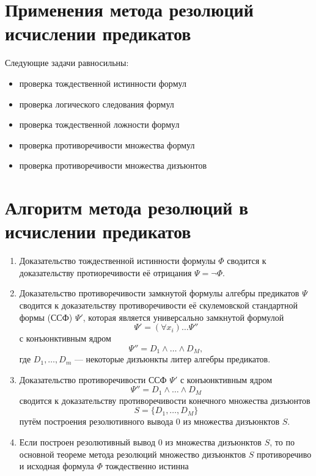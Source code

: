 \section{Применения метода резолюций исчислении предикатов}
Следующие задачи равносильны:
\begin{itemize}
    \item проверка тождественной истинности формул
    \item проверка логического следования формул
    \item проверка тождественной ложности формул
    \item проверка противоречивости множества формул
    \item проверка противоречивости множества дизъюнтов
\end{itemize}

\section{Алгоритм метода резолюций в исчислении предикатов}
\begin{enumerate}
    \item Доказательство тождественной истинности формулы $\Phi$ сводится к доказательству протиоречивости её отрицания $\Psi = \lnot \Phi$.
    \item Доказательство противоречивости замкнутой формулы алгебры предикатов $\Psi$ сводится к доказательству противоречивости её скулемовской стандартной формы (ССФ) $\Psi'$, которая является универсально замкнутой формулой $$\Psi' = (\forall x_i) \dots \Psi''$$ с конъюнктивным ядром $$\Psi'' = D_1 \land \dots \land D_M,$$ где $D_1,\dots,D_m$ --- некоторые дизъюнкты литер алгебры предикатов.
    \item Доказательство противоречивости ССФ $\Psi'$ с конъюнктивным ядром $$\Psi'' = D_1 \land \dots \land D_M$$ сводится к доказательству противоречивости конечного множества дизъюнтов $$S = \{D_1,\dots,D_M\}$$ путём построения резолютивного вывода $0$ из множества дизъюнктов $S$.
    \item Если построен резолютивный вывод 0 из множества дизъюнктов $S$, то по основной теореме метода резолюций множество дизъюнктов $S$ противоречиво и исходная формула $\Phi$ тождественно истинна
\end{enumerate}

